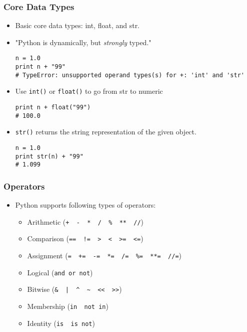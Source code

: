 \documentclass{beamer}
\begin{document}
\begin{frame}[fragile]
\frametitle{Core Data Types}
\begin{itemize}
\item Basic core data types: int, float, and str.
\item "Python is dynamically, but \emph{strongly} typed."
\begin{lstlisting}
n = 1.0
print n + "99"
# TypeError: unsupported operand types(s) for +: 'int' and 'str'
\end{lstlisting}
\item Use \lstinline{int()} or \lstinline{float()}
      to go from str to numeric
\begin{lstlisting}
print n + float("99")
# 100.0
\end{lstlisting}
\item \lstinline{str()} returns the string representation
      of the given object.
\begin{lstlisting}
n = 1.0
print str(n) + "99"
# 1.099 
\end{lstlisting}
\end{itemize} 
\end{frame}

\begin{frame}[fragile]
\frametitle{Operators}
\begin{itemize}
\item Python supports following types of operators:

\begin{itemize}
\item Arithmetic (\lstinline{+  -  *  /  %  **  //})
\item Comparison (\lstinline{==  !=  >  <  >=  <=})
\item Assignment (\lstinline{=  +=  -=  *=  /=  %=  **=  //=})
\item Logical (\lstinline{and or not})
\item Bitwise (\lstinline{&  |  ^  ~  <<  >>})
\item Membership (\lstinline{in  not in})
\item Identity (\lstinline{is  is not})
\end{itemize}
\end{itemize}
\end{frame}
\end{document}
